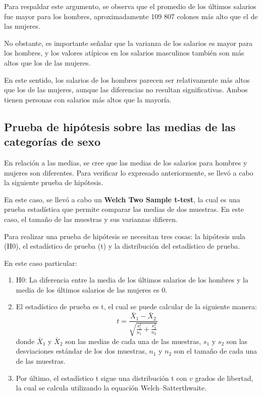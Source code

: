 \documentclass[
]{article}
\providecommand{\tightlist}{%
  \setlength{\itemsep}{0pt}\setlength{\parskip}{0pt}}
\begin{document}
Para respaldar este argumento, se observa que el promedio de los últimos
salarios fue mayor para los hombres, aproximadamente 109 807 colones más
alto que el de las mujeres.

No obstante, es importante señalar que la varianza de los salarios es
mayor para los hombres, y los valores atípicos en los salarios
masculinos también son más altos que los de las mujeres.

En este sentido, los salarios de los hombres parecen ser relativamente
más altos que los de las mujeres, aunque las diferencias no resultan
significativas. Ambos tienen personas con salarios más altos que la
mayoría.

\hypertarget{prueba-de-hipuxf3tesis-sobre-las-medias-de-las-categoruxedas-de-sexo}{%
\subsection{Prueba de hipótesis sobre las medias de las categorías de
sexo}\label{prueba-de-hipuxf3tesis-sobre-las-medias-de-las-categoruxedas-de-sexo}}

En relación a las medias, se cree que las medias de los salarios para
hombres y mujeres son diferentes. Para verificar lo expresado
anteriormente, se llevó a cabo la siguiente prueba de hipótesis.

En este caso, se llevó a cabo un \textbf{Welch Two Sample t-test}, la
cual es una prueba estadística que permite comparar las medias de dos
muestras. En este caso, el tamaño de las muestras y sus varianzas
difieren.

Para realizar una prueba de hipótesis se necesitan tres cosas: la
hipótesis nula (H0), el estadístico de prueba (t) y la distribución del
estadístico de prueba.

En este caso particular:

\begin{enumerate}
\def\labelenumi{\arabic{enumi}.}
\tightlist
\item
  H0: La diferencia entre la media de los últimos salarios de los
  hombres y la media de los últimos salarios de las mujeres es 0.
\item
  El estadístico de prueba es t, el cual se puede calcular de la
  siguiente manera:
  \[ t = \frac{\bar{X}_1 - \bar{X}_2}{\sqrt{\frac{s_1^2}{n_1} + \frac{s_2^2}{n_2}}} \]
  donde \(\bar{X}_1\) y \(\bar{X}_2\) son las medias de cada una de las
  muestras, \(s_1\) y \(s_2\) son las desviaciones estándar de los dos
  muestras, \(n_1\) y \(n_2\) son el tamaño de cada una de las muestras.
\item
  Por último, el estadístico t sigue una distribución t con \(v\) grados
  de libertad, la cual se calcula utilizando la equación
  Welch--Satterthwaite.
\end{enumerate}
\end{document}
